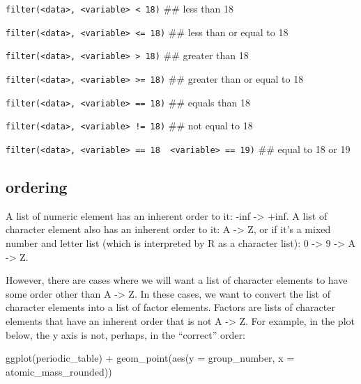 \documentclass[
]{krantz}
\newenvironment{Shaded}{\begin{snugshade}}{\end{snugshade}}
\newcommand{\AttributeTok}[1]{\textcolor[rgb]{0.77,0.63,0.00}{#1}}
\newcommand{\FunctionTok}[1]{\textcolor[rgb]{0.00,0.00,0.00}{#1}}
\newcommand{\NormalTok}[1]{#1}
\newcommand{\SpecialCharTok}[1]{\textcolor[rgb]{0.00,0.00,0.00}{#1}}
\begin{document}
\texttt{filter(\textless{}data\textgreater{},\ \textless{}variable\textgreater{}\ \textless{}\ 18)} \#\# less than 18

\texttt{filter(\textless{}data\textgreater{},\ \textless{}variable\textgreater{}\ \textless{}=\ 18)} \#\# less than or equal to 18

\texttt{filter(\textless{}data\textgreater{},\ \textless{}variable\textgreater{}\ \textgreater{}\ 18)} \#\# greater than 18

\texttt{filter(\textless{}data\textgreater{},\ \textless{}variable\textgreater{}\ \textgreater{}=\ 18)} \#\# greater than or equal to 18

\texttt{filter(\textless{}data\textgreater{},\ \textless{}variable\textgreater{}\ ==\ 18)} \#\# equals than 18

\texttt{filter(\textless{}data\textgreater{},\ \textless{}variable\textgreater{}\ !=\ 18)} \#\# not equal to 18

\texttt{filter(\textless{}data\textgreater{},\ \textless{}variable\textgreater{}\ ==\ 18\ \textbar{}\ \textless{}variable\textgreater{}\ ==\ 19)} \#\# equal to 18 or 19

\hypertarget{ordering}{%
\subsection{ordering}\label{ordering}}

A list of numeric element has an inherent order to it: -inf -\textgreater{} +inf. A list of character element also has an inherent order to it: A -\textgreater{} Z, or if it's a mixed number and letter list (which is interpreted by R as a character list): 0 -\textgreater{} 9 -\textgreater{} A -\textgreater{} Z.

However, there are cases where we will want a list of character elements to have some order other than A -\textgreater{} Z. In these cases, we want to convert the list of character elements into a list of factor elements. Factors are lists of character elements that have an inherent order that is not A -\textgreater{} Z. For example, in the plot below, the y axis is not, perhaps, in the ``correct'' order:

\begin{Shaded}
\begin{Highlighting}[]
\FunctionTok{ggplot}\NormalTok{(periodic\_table) }\SpecialCharTok{+}
  \FunctionTok{geom\_point}\NormalTok{(}\FunctionTok{aes}\NormalTok{(}\AttributeTok{y =}\NormalTok{ group\_number, }\AttributeTok{x =}\NormalTok{ atomic\_mass\_rounded))}
\end{Highlighting}
\end{Shaded}
\end{document}
